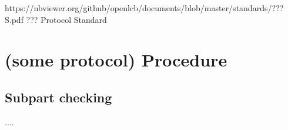 



\maketitle
\thispagestyle{firststyle}

\introductionCaveats
    {https://nbviewer.org/github/openlcb/documents/blob/master/standards/???S.pdf}
    {??? Protocol Standard}


\section{(some protocol) Procedure}


\subsection{Subpart checking}

....


  
